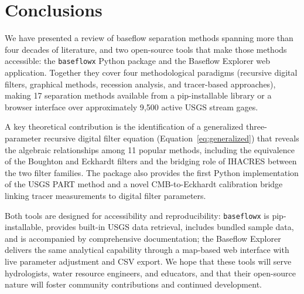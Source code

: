 \documentclass[hydrology,article,submit,pdftex,moreauthors]{Definitions/mdpi}
\begin{document}
\section{Conclusions}
\label{sec:conclusions}

We have presented a review of baseflow separation methods spanning more than four decades of literature, and two open-source tools that make those methods accessible: the \texttt{baseflowx} Python package and the Baseflow Explorer web application. Together they cover four methodological paradigms (recursive digital filters, graphical methods, recession analysis, and tracer-based approaches), making 17 separation methods available from a pip-installable library or a browser interface over approximately 9{,}500 active USGS stream gages.

A key theoretical contribution is the identification of a generalized three-parameter recursive digital filter equation (Equation~\ref{eq:generalized}) that reveals the algebraic relationships among 11 popular methods, including the equivalence of the Boughton and Eckhardt filters and the bridging role of IHACRES between the two filter families. The package also provides the first Python implementation of the USGS PART method and a novel CMB-to-Eckhardt calibration bridge linking tracer measurements to digital filter parameters.

Both tools are designed for accessibility and reproducibility: \texttt{baseflowx} is pip-installable, provides built-in USGS data retrieval, includes bundled sample data, and is accompanied by comprehensive documentation; the Baseflow Explorer delivers the same analytical capability through a map-based web interface with live parameter adjustment and CSV export. We hope that these tools will serve hydrologists, water resource engineers, and educators, and that their open-source nature will foster community contributions and continued development.

\vspace{6pt}


\end{document}
